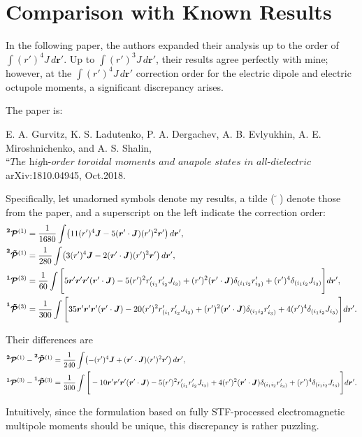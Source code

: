\documentclass{article}
\begin{document}
\section{Comparison with Known Results}

In the following paper, the authors expanded their analysis up to the order of $\int (r')^4 J \, d\bm{r}'$. Up to $\int (r')^3 J \, d\bm{r}'$, their results agree perfectly with mine; however, at the $\int (r')^4 J \, d\bm{r}'$ correction order for the electric dipole and electric octupole moments, a significant discrepancy arises.  

The paper is:  

E. A. Gurvitz, K. S. Ladutenko, P. A. Dergachev, A. B. Evlyukhin, A. E. Miroshnichenko, and A. S. Shalin,  
$\textit{“The high-order toroidal moments and anapole states in all-dielectric photonics,”}$arXiv:1810.04945, Oct.2018.

Specifically, let unadorned symbols denote my results, a tilde ($\tilde{\phantom{a}}$) denote those from the paper, and a superscript on the left indicate the correction order:
\[
\begin{split}
	\bm{\prescript{2}{}{\mathcal{P}}}^{(1)} &= \frac{1}{1680} \int \!\left( 11 (r')^4 \bm{J} - 5 (\bm{r}' \cdot \bm{J}) (r')^2 \bm{r}' \right) d\bm{r}', \\
	\bm{\prescript{2}{}{\tilde{\mathcal{P}}}}^{(1)} &= \frac{1}{280} \int \!\left( 3 (r')^4 \bm{J} - 2 (\bm{r}' \cdot \bm{J}) (r')^2 \bm{r}' \right) d\bm{r}', \\
	\bm{\prescript{1}{}{\mathcal{P}}}^{(3)} &= \frac{1}{60} \int \Bigg[ 5 \bm{r}' \bm{r}' \bm{r}' (\bm{r}' \cdot \bm{J})
	- 5 (r')^2 r'_{(i_1} r'_{i_2} J_{i_3)} + (r')^2 (\bm{r}' \cdot \bm{J}) \delta_{(i_1 i_2} r'_{i_3)}
	+ (r')^4 \delta_{(i_1 i_2} J_{i_3)} \Bigg] d\bm{r}', \\
	\bm{\prescript{1}{}{\tilde{\mathcal{P}}}}^{(3)} &= \frac{1}{300} \int \Bigg[ 35 \bm{r}' \bm{r}' \bm{r}' (\bm{r}' \cdot \bm{J})
	- 20 (r')^2 r'_{(i_1} r'_{i_2} J_{i_3)} + (r')^2 (\bm{r}' \cdot \bm{J}) \delta_{(i_1 i_2} r'_{i_3)}
	+ 4 (r')^4 \delta_{(i_1 i_2} J_{i_3)} \Bigg] d\bm{r}'.
\end{split}
\]

Their differences are
\[
\begin{split}
	\bm{\prescript{2}{}{\mathcal{P}}}^{(1)} - \bm{\prescript{2}{}{\tilde{\mathcal{P}}}}^{(1)} &=
	\frac{1}{240} \int \!\left( - (r')^4 \bm{J} + (\bm{r}' \cdot \bm{J}) (r')^2 \bm{r}' \right) d\bm{r}', \\
	\bm{\prescript{1}{}{\mathcal{P}}}^{(3)} - \bm{\prescript{1}{}{\tilde{\mathcal{P}}}}^{(3)} &=
	\frac{1}{300} \int \Bigg[ -10 \bm{r}' \bm{r}' \bm{r}' (\bm{r}' \cdot \bm{J})
	- 5 (r')^2 r'_{(i_1} r'_{i_2} J_{i_3)} + 4 (r')^2 (\bm{r}' \cdot \bm{J}) \delta_{(i_1 i_2} r'_{i_3)}
	+ (r')^4 \delta_{(i_1 i_2} J_{i_3)} \Bigg] d\bm{r}'.
\end{split}
\]

Intuitively, since the formulation based on fully STF-processed electromagnetic multipole moments should be unique, this discrepancy is rather puzzling.
\end{document}
